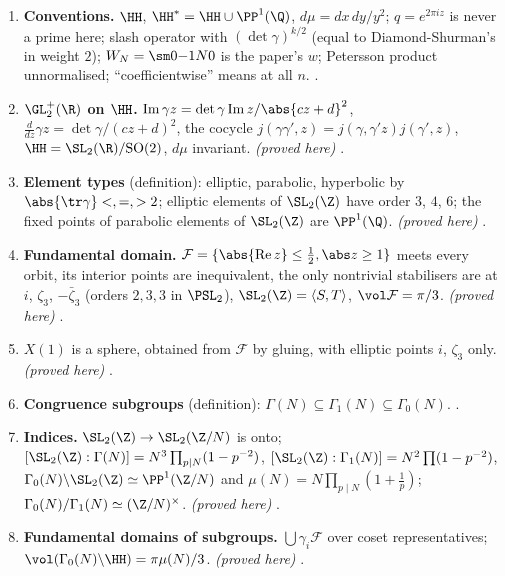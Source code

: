 \begin{enumerate}[label=\textbf{\thechapter.\arabic*}]
\item \textbf{Conventions.} $\HH$, $\HH^*=\HH\cup\PP^1(\Q)$, $d\mu=dx\,dy/y^2$; $q=e^{2\pi iz}$ is never a prime here; slash operator with $(\det\gamma)^{k/2}$ (equal to Diamond-Shurman's in weight
$2$); $W_N=\sm0{-1}N0$ is the paper's $w$; Petersson product unnormalised; ``coefficientwise'' means at all $n$. .
\item \textbf{$\GL_2^+(\R)$ on $\HH$.} $\operatorname{Im}\gamma z=\det\gamma\operatorname{Im}z/\abs{cz+d}^2$, $\frac{d}{dz}\gamma z=\det\gamma/(cz+d)^2$, the cocycle $j(\gamma\gamma',z)=j(\gamma,\gamma'z)j(\gamma',z)$, $\HH=\SL_2(\R)/\mathrm{SO}(2)$, $d\mu$
invariant. \emph{(proved here)} .
\item \textbf{Element types} (definition): elliptic, parabolic, hyperbolic by $\abs{\tr\gamma}<,=,>2$; elliptic elements of $\SL_2(\Z)$ have order $3$, $4$, $6$; the fixed points of parabolic
elements of $\SL_2(\Z)$ are $\PP^1(\Q)$. \emph{(proved here)} .
\item \textbf{Fundamental domain.} $\mathcal F=\{\abs{\operatorname{Re}z}\le\frac12,\abs z\ge1\}$ meets every orbit, its interior points are inequivalent, the only nontrivial stabilisers are at $i$, $\zeta_3$,
$-\bar\zeta_3$ (orders $2,3,3$ in $\PSL_2$), $\SL_2(\Z)=\langle S,T\rangle$, $\vol\mathcal F=\pi/3$. \emph{(proved here)} .
\item \textbf{$X(1)$} is a sphere, obtained from $\mathcal F$ by gluing, with elliptic points $i$, $\zeta_3$ only. \emph{(proved here)} .
\item \textbf{Congruence subgroups} (definition): $\Gamma(N)\subseteq\Gamma_1(N)\subseteq\Gamma_0(N)$. .
\item \textbf{Indices.} $\SL_2(\Z)\to\SL_2(\Z/N)$ is onto; $[\SL_2(\Z):\Gamma(N)]=N^3\prod_{p\mid N}(1-p^{-2})$, $[\SL_2(\Z):\Gamma_1(N)]=N^2\prod(1-p^{-2})$,
$\Gamma_0(N)\backslash\SL_2(\Z)\simeq\PP^1(\Z/N)$ and $\mu(N)=N\prod_{p\mid N}(1+\frac1p)$; $\Gamma_0(N)/\Gamma_1(N)\simeq(\Z/N)^\times$. \emph{(proved here)} .
\item \textbf{Fundamental domains of subgroups.} $\bigcup\gamma_i\mathcal F$ over coset representatives; $\vol(\Gamma_0(N)\backslash\HH)=\pi\mu(N)/3$. \emph{(proved here)} .

\end{enumerate}
